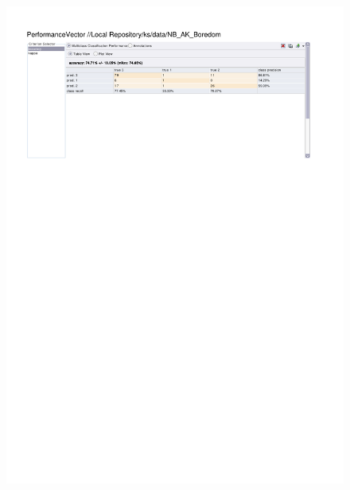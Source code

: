 \begin{figure}[htp]
  \centerline{\includegraphics[trim=0 680 0 60,clip,width=16.09cm]{results/NB_A_Boredom.pdf}} \caption{
} \label{NB_K_Boredom}
\end{figure}

